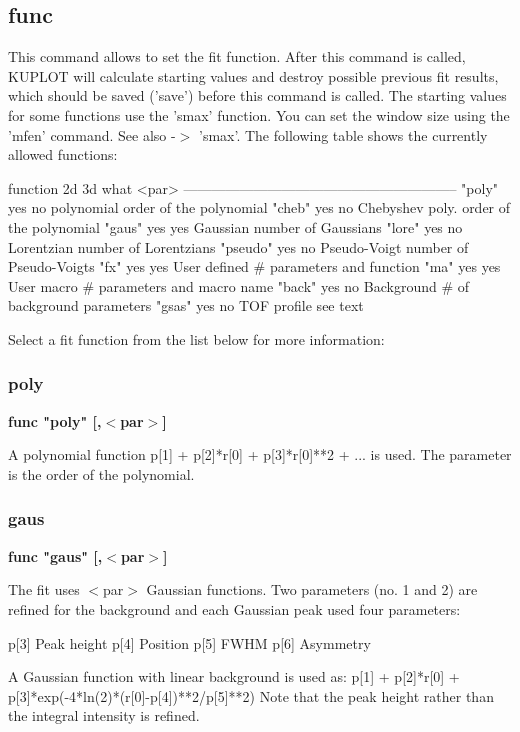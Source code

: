 \subsection*{func}
\par
This command allows to set the fit function. After this command is 
called, KUPLOT will calculate starting values and destroy possible 
previous fit results, which should be saved ('save') before this 
command is called. The starting values for some functions use the 
'smax' function. You can set the window size using the 'mfen' command. 
See also -$> $ 'smax'. The following table shows the currently allowed 
functions: 
\par
\begin{MacVerbatim}
function   2d   3d   what            <par>
-----------------------------------------------------------
 "poly"    yes  no   polynomial         order of the polynomial
 "cheb"    yes  no   Chebyshev poly. order of the polynomial
 "gaus"    yes  yes  Gaussian        number of Gaussians
 "lore"    yes  no   Lorentzian      number of Lorentzians
 "pseudo"  yes  no   Pseudo-Voigt    number of Pseudo-Voigts
 "fx"      yes  yes  User defined    # parameters and function
 "ma"      yes  yes  User macro      # parameters and macro name
 "back"    yes  no   Background      # of background parameters
 "gsas"    yes  no   TOF profile     see text
\end{MacVerbatim}
Select a fit function from the list below for more information: 
\subsubsection{poly}
{\bf func "poly" [,$ <$par$> $] \par }
\par
\vspace{3pt}
A polynomial function p[1] + p[2]*r[0] + p[3]*r[0]**2 + ... 
is used. The parameter is the order of the polynomial. 
\subsubsection{gaus}
{\bf func "gaus" [,$ <$par$> $] \par }
\par
\vspace{3pt}
The fit uses $ <$par$> $ Gaussian functions. Two parameters (no. 1 
and 2) are refined for the background and each Gaussian peak used 
four parameters: 
\par
\begin{MacVerbatim}
p[3] Peak height
p[4] Position
p[5] FWHM
p[6] Asymmetry
\end{MacVerbatim}
A Gaussian function with linear background is used as: 
p[1] + p[2]*r[0] + p[3]*exp(-4*ln(2)*(r[0]-p[4])**2/p[5]**2) 
Note that the peak height rather than the integral intensity 
is refined. 
